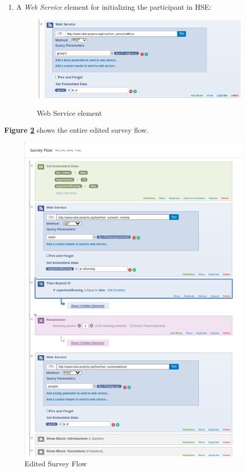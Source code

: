 \documentclass[a4paper]{usiinfbachelorproject}
\begin{document}
\begin{appendices}
\begin{enumerate}
        \item
            A \emph{Web Service} element for initializing the participant in HSE:

            \begin{figure} [h]
            \centering
            \includegraphics[width=.9\textwidth]{figures/qflow5}
            \label{fig:qflow5} 
            \caption[]{Web Service element}
            \end{figure}

        \end{enumerate}

        \vspace{.5cm}

        \textbf{Figure \ref{fig:qflow}} shows the entire edited survey flow.


        \begin{figure} [h]
        \centering
        \includegraphics[width=.9\textwidth]{figures/qflow}
        \caption[]{Edited Survey Flow}
        \label{fig:qflow}
        \end{figure}


\end{appendices}
\end{document}
